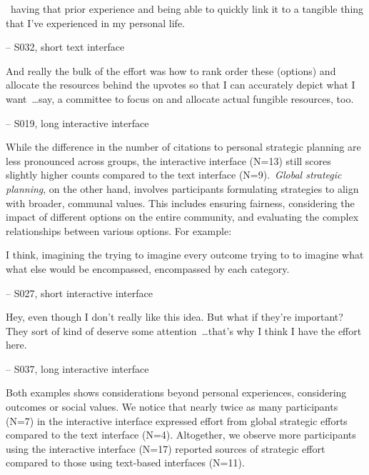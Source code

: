\begin{displayquote}
~\bracketellipsis having that prior experience and being able to quickly link it to a tangible thing that I've experienced in my personal life.

\noindent \hfill -- S032, short text interface
\end{displayquote}

\begin{displayquote}
And really the bulk of the effort was how to rank order these (options) and allocate the resources behind the upvotes so that I can accurately depict what I want~\ldots say, a committee to focus on and allocate actual fungible resources, too. 

\noindent \hfill -- S019, long interactive interface
\end{displayquote}

While the difference in the number of citations to personal strategic planning are less pronounced across groups, the interactive interface (N=13) still scores slightly higher counts compared to the text interface (N=9).~\textit{Global strategic planning}, on the other hand, involves participants formulating strategies to align with broader, communal values. This includes ensuring fairness, considering the impact of different options on the entire community, and evaluating the complex relationships between various options. For example:

\begin{displayquote}
I think, imagining the trying to imagine every outcome trying to to imagine what what else would be encompassed, encompassed by each category.

\noindent \hfill -- S027, short interactive interface
\end{displayquote}

\begin{displayquote}
Hey, even though I don't really like this idea. But what if they're important? They sort of kind of deserve some attention~\ldots that's why I think I have the effort here.

\noindent \hfill -- S037, long interactive interface
\end{displayquote}
    
Both examples shows considerations beyond personal experiences, considering outcomes or social values. We notice that nearly twice as many participants (N=7) in the interactive interface expressed effort from global strategic efforts compared to the text interface (N=4). Altogether, we observe more participants using the interactive interface (N=17) reported sources of strategic effort compared to those using text-based interfaces (N=11). 

